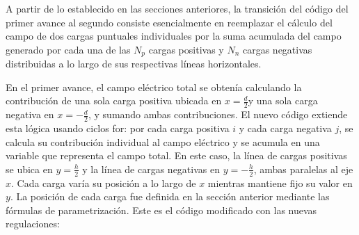 
\tab A partir de lo establecido en las secciones anteriores, la transición del código del primer avance al segundo consiste esencialmente en reemplazar el cálculo del campo de dos cargas puntuales individuales por la suma acumulada del campo generado por cada una de las $N_p$ cargas positivas y $N_n$ cargas negativas distribuidas a lo largo de sus respectivas líneas
horizontales.

\tab En el primer avance, el campo eléctrico total se obtenía calculando la contribución de una sola carga positiva ubicada en $x =\frac{d}{2}$y una sola carga negativa en $x =-\frac{d}{2}$, y sumando ambas contribuciones. El nuevo código extiende esta lógica usando ciclos for: por cada carga positiva $i$ y cada carga negativa $j$, se calcula su contribución individual al campo eléctrico y se acumula en una variable que representa el campo total. En este caso, la línea de cargas positivas se ubica en $y = \frac{h}{2}$ y la línea de cargas negativas en $y = -\frac{h}{2}$, ambas paralelas al eje $x$. Cada carga varía su posición a lo largo de $x$ mientras mantiene fijo su valor en $y$. La posición de cada carga fue definida en la sección anterior mediante las fórmulas de parametrización. Este es el código modificado con las nuevas regulaciones: